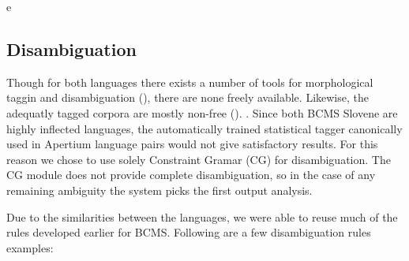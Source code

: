 e
\subsection{Disambiguation}
Though for both languages there exists a number of tools for
morphological taggin and disambiguation (), there
are none freely available. Likewise, the adequatly tagged corpora are
mostly non-free (). .  Since both BCMS Slovene are
highly inflected languages, the automatically trained statistical
tagger canonically used in Apertium language pairs would not give
satisfactory results. For this reason we chose to use solely
Constraint Gramar (CG) for disambiguation. The CG module does not
provide complete disambiguation, so in the case of any remaining
ambiguity the system picks the first output analysis.

Due to the similarities between the languages, we were able to
reuse much of the rules developed earlier for BCMS. Following are
a few disambiguation rules examples:

